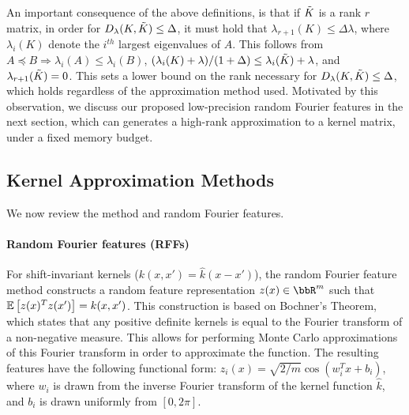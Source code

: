 An important consequence of the above definitions, is that if $\tilde{K}$ is a rank $r$ matrix, 
in order for $D_{\lambda}(K,\tilde{K}) \leq \Delta$, it must hold that $\lambda_{r+1}(K) \leq \Delta \lambda$, where $\lambda_i(K)$ denote the $i^{th}$ largest eigenvalues of $A$.  This follows from $A\preceq B \Rightarrow \lambda_i(A) \leq \lambda_i(B)$, $(\lambda_i(K) + \lambda)/(1+\Delta) \leq \lambda_i(\tilde{K}) + \lambda$, and $\lambda_{r+1}(\tilde{K}) = 0$.  This sets a lower bound on the rank necessary for $D_{\lambda}(K,\tilde{K}) \leq \Delta$, which holds regardless of the approximation method used.  
Motivated by this observation, we discuss our proposed low-precision random Fourier features in the next section, which can generates a high-rank approximation to a kernel matrix, under a fixed memory budget.

\subsection{Kernel Approximation Methods}
We now review the \Nystrom method and random Fourier features.

\paragraph{Random Fourier features (RFFs)}
For shift-invariant kernels ($k(x,x') = \hat{k}(x-x')$), the random Fourier 
feature method \citep{rahimi07random} constructs a random feature representation 
$z(x) \in \RR^m$ such that $\expect{}{z(x)^T z(x')} = k(x,x')$. This construction 
is based on Bochner's Theorem, which states that any positive definite kernels is 
equal to the Fourier transform of a non-negative measure. This allows for performing
Monte Carlo approximations of this Fourier transform in order to approximate the 
function.  The resulting features have the following functional form: 
$z_i(x) = \sqrt{2/m}\cos(w_i^Tx + b_i)$, where $w_i$ is drawn from the inverse Fourier
transform of the kernel function $\hat{k}$, and $b_i$ is drawn uniformly from $[0,2\pi]$. 


